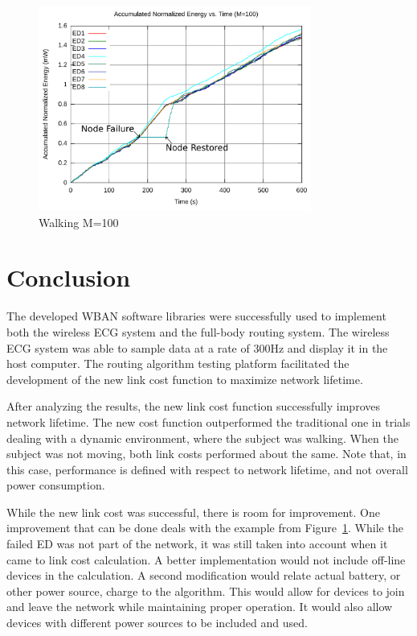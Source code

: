 \documentclass{article}
\begin{document}
\begin{figure}[!ht]
\includegraphics[width=0.8\textwidth]{figures/walk4-c100.pdf}
\caption{Walking M=100}
\label{fig:walk4-c100}
\end{figure}

\section{Conclusion}
The developed WBAN software libraries were successfully used to implement both the wireless ECG system and the full-body routing system. The wireless ECG system was able to sample data at a rate of 300Hz and display it in the host computer. The routing algorithm testing platform facilitated the development of the new link cost function to maximize network lifetime.

After analyzing the results, the new link cost function successfully improves network lifetime. The new cost function outperformed the traditional one in trials dealing with a dynamic environment, where the subject was walking. When the subject was not moving, both link costs performed about the same. Note that, in this case, performance is defined with respect to network lifetime, and not overall power consumption.

While the new link cost was successful, there is room for improvement. One improvement that can be done deals with the example from Figure~\ref{fig:walk4-c100}. While the failed ED was not part of the network, it was still taken into account when it came to link cost calculation. A better implementation would not include off-line devices in the calculation. A second modification would relate actual battery, or other power source, charge to the algorithm. This would allow for devices to join and leave the network while maintaining proper operation. It would also allow devices with different power sources to be included and used.
\end{document}
